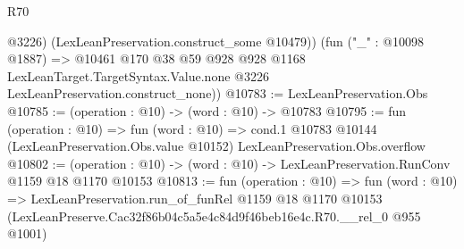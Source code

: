 \begin{lexlean}{R70}
\begin{coremodule}
          @3226)
        (LexLeanPreservation.construct_some @10479))
      (fun ("_" : @10098 @1887) =>
      @10461
        @170
        @38
        @59
        @928
        @928
        @1168
        LexLeanTarget.TargetSyntax.Value.none
        @3226
        LexLeanPreservation.construct_none))
@10783 := LexLeanPreservation.Obs
@10785 := (operation : @10) -> (word : @10) -> @10783
@10795 := fun (operation : @10) =>
  fun (word : @10) =>
  cond.{1} @10783 @10144 (LexLeanPreservation.Obs.value @10152) LexLeanPreservation.Obs.overflow
@10802 := (operation : @10) -> (word : @10) -> LexLeanPreservation.RunConv @1159 @18 @1170 @10153
@10813 := fun (operation : @10) =>
  fun (word : @10) =>
  LexLeanPreservation.run_of_funRel
    @1159
    @18
    @1170
    @10153
    (LexLeanPreserve.Cac32f86b04c5a5e4c84d9f46beb16e4c.R70.__rel_0 @955 @1001)
\end{coremodule}
\end{lexlean}
